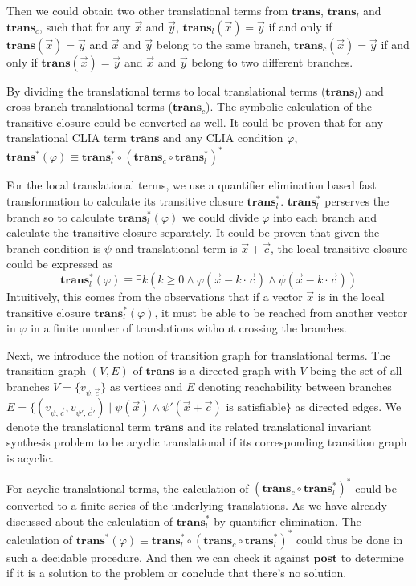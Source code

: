 \documentclass[conference]{IEEEtran}
\newcommand{\vecx}{\vec{x}}
\newcommand{\vecy}{\vec{y}}
\newcommand{\vecc}{\vec{c}}
\newcommand{\post}{\mathrm{\mathbf{post}}}
\newcommand{\trans}{\mathrm{\mathbf{trans}}}
\begin{document}
Then we could obtain two other translational terms from $\trans$, $\trans_l$ and $\trans_c$, such that for any $\vecx$ and $\vecy$, $\trans_l(\vecx) = \vecy$ if and only if $\trans(\vecx) = \vecy$ and $\vecx$ and $\vecy$ belong to the same branch, $\trans_c(\vecx) = \vecy$ if and only if $\trans(\vecx) = \vecy$ and $\vecx$ and $\vecy$ belong to two different branches.

By dividing the translational terms to local translational terms ($\trans_l$) and cross-branch translational terms ($\trans_c$). The symbolic calculation of the transitive closure could be converted as well. It could be proven that for any translational CLIA term $\trans$ and any CLIA condition $\varphi$, $\trans^*(\varphi)\equiv \trans_l^*\circ(\trans_c\circ\trans_l^*)^*$

For the local translational terms, we use a quantifier elimination based fast transformation to calculate its transitive closure $\trans_l^*$. $\trans_l^*$ perserves the branch so to calculate $\trans_l^*(\varphi)$ we could divide $\varphi$ into each branch and calculate the transitive closure separately. It could be proven that given the branch condition is $\psi$ and translational term is $\vecx + \vecc$, the local transitive closure could be expressed as
$$\trans_l^*(\varphi) \equiv \exists k \left(k\ge 0 \land \varphi(\vecx - k\cdot\vecc) \land \psi(\vecx - k \cdot\vecc)\right)$$ Intuitively, this comes from the observations that if a vector $\vecx$ is in the local transitive closure $\trans_l^*(\varphi)$, it must be able to be reached from another vector in $\varphi$ in a finite number of translations without crossing the branches.

Next, we introduce the notion of transition graph for translational terms. The transition graph $(V, E)$ of $\trans$ is a directed graph with $V$ being the set of all branches $V = \{v_{\psi,\vecc}\}$ as vertices and $E$ denoting reachability between branches $E = \{ (v_{\psi, \vecc}, v_{\psi', \vecc'}) \mid \psi(\vecx) \wedge \psi'(\vecx+\vecc) \textrm{ is satisfiable} \}$ as directed edges. We denote the translational term $\trans$ and its related translational invariant synthesis problem to be acyclic translational if its corresponding transition graph is acyclic.

For acyclic translational terms, the calculation of $(\trans_c\circ\trans_l^*)^*$ could be converted to a finite series of the underlying translations. As we have already discussed about the calculation of $\trans_l^*$ by quantifier elimination. The calculation of  $\trans^*(\varphi)\equiv \trans_l^*\circ(\trans_c\circ\trans_l^*)^*$ could thus be done in such a decidable procedure. And then we can check it against $\post$ to determine if it is a solution to the problem or conclude that there's no solution.
\end{document}

